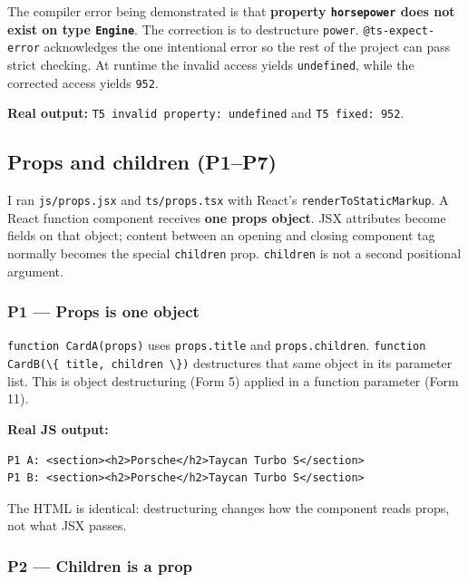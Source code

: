 \documentclass[
  9pt,
]{article}
\newcommand{\passthrough}[1]{#1}
\begin{document}
The compiler error being demonstrated is that \textbf{property
\passthrough{\lstinline!horsepower!} does not exist on type
\passthrough{\lstinline!Engine!}}. The correction is to destructure
\passthrough{\lstinline!power!}.
\passthrough{\lstinline!@ts-expect-error!} acknowledges the one
intentional error so the rest of the project can pass strict checking.
At runtime the invalid access yields
\passthrough{\lstinline!undefined!}, while the corrected access yields
\passthrough{\lstinline!952!}.

\textbf{Real output:}
\passthrough{\lstinline!T5 invalid property: undefined!} and
\passthrough{\lstinline!T5 fixed: 952!}.

\subsection{Props and children (P1--P7)}\label{props-and-children-p1p7}

I ran \passthrough{\lstinline!js/props.jsx!} and
\passthrough{\lstinline!ts/props.tsx!} with React's
\passthrough{\lstinline!renderToStaticMarkup!}. A React function
component receives \textbf{one props object}. JSX attributes become
fields on that object; content between an opening and closing component
tag normally becomes the special \passthrough{\lstinline!children!}
prop. \passthrough{\lstinline!children!} is not a second positional
argument.

\subsubsection{P1 --- Props is one object}\label{p1-props-is-one-object}

\passthrough{\lstinline!function CardA(props)!} uses
\passthrough{\lstinline!props.title!} and
\passthrough{\lstinline!props.children!}.
\passthrough{\lstinline!function CardB(\{ title, children \})!}
destructures that same object in its parameter list. This is object
destructuring (Form 5) applied in a function parameter (Form 11).

\textbf{Real JS output:}

\begin{lstlisting}
P1 A: <section><h2>Porsche</h2>Taycan Turbo S</section>
P1 B: <section><h2>Porsche</h2>Taycan Turbo S</section>
\end{lstlisting}

The HTML is identical: destructuring changes how the component reads
props, not what JSX passes.

\subsubsection{P2 --- Children is a prop}\label{p2-children-is-a-prop}
\end{document}
